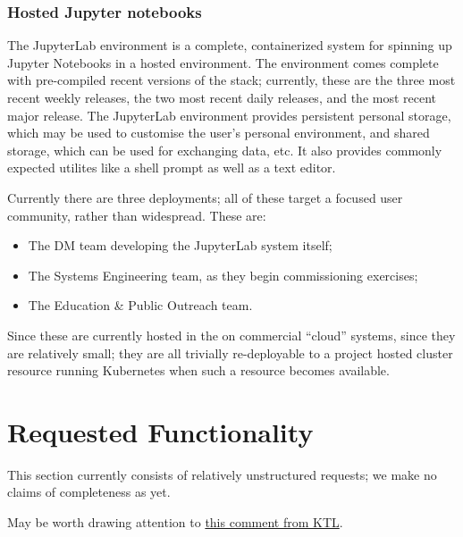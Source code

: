 \documentclass[DM,authoryear,toc,lsstdraft]{lsstdoc}
\begin{document}
\subsubsection{Hosted Jupyter notebooks}
\label{sec:current:square:jl}

The JupyterLab environment is a complete, containerized system for spinning up
Jupyter Notebooks in a hosted environment. The environment comes complete with
pre-compiled recent versions of the stack; currently, these are the three most
recent weekly releases, the two most recent daily releases, and the most
recent major release. The JupyterLab environment provides persistent personal
storage, which may be used to customise the user's personal environment, and
shared storage, which can be used for exchanging data, etc.  It also provides
commonly expected utilites like a shell prompt as well as a text editor.

Currently there are three deployments; all of these target a focused user
community, rather than widespread. These are:

\begin{itemize}

  \item{The DM team developing the JupyterLab system itself;}
  \item{The Systems Engineering team, as they begin commissioning exercises;}
  \item{The Education \& Public Outreach team.}

\end{itemize}

Since these are currently hosted in the on commercial ``cloud'' systems, since
they are relatively small; they are all trivially re-deployable to a project
hosted cluster resource running Kubernetes when such a resource becomes
available.

\section{Requested Functionality}
\label{sec:use}

\begin{note}
This section currently consists of relatively unstructured requests; we make
no claims of completeness as yet.

May be worth drawing attention to
\href{https://github.com/lsst-dm/dmtn-074/commit/06fa883ebeb12cf728dda14fa82e4c1f01fa5696#r27754730}{this
comment from KTL}.
\end{note}
\end{document}

